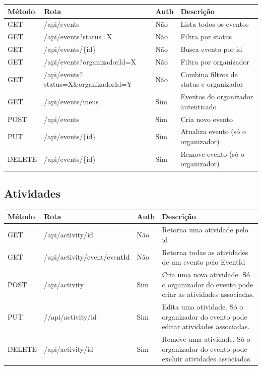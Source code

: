\documentclass[11pt, a4paper, oneside]{article}
\begin{document}
\begin{longtable}{L{1.5cm} L{6cm} L{1.5cm} L{5.5cm}}
\toprule
{}
\color{white}\textbf{Método} & \color{white}\textbf{Rota} & \color{white}\textbf{Auth} & \color{white}\textbf{Descrição} \\
\midrule
\endhead
GET & /api/events & Não & Lista todos os eventos \\
GET & /api/events?status=X & Não & Filtra por status \\
GET & /api/events/\{id\} & Não & Busca evento por id \\
GET & /api/events?organizadorId=X & Não & Filtra por organizador \\
GET & /api/events?status=X\&organizadorId=Y & Não & Combina filtros de status e organizador \\
GET & /api/events/meus & Sim & Eventos do organizador autenticado \\
POST & /api/events & Sim & Cria novo evento \\
PUT & /api/events/\{id\} & Sim & Atualiza evento (só o organizador) \\
DELETE & /api/events/\{id\} & Sim & Remove evento (só o organizador) \\
\bottomrule
\end{longtable}

\subsection{Atividades}

\begin{longtable}{L{1.5cm} L{6cm} L{1.5cm} L{5.5cm}}
\toprule
{}
\color{white}\textbf{Método} & \color{white}\textbf{Rota} & \color{white}\textbf{Auth} & \color{white}\textbf{Descrição} \\
\midrule
\endhead
GET & /api/activity/{id} & Não & Retorna uma atividade pelo id \\
GET & /api/activity/event/{eventId} & Não & Retorna todas as atividades de um evento pelo EventId \\
POST & /api/activity & Sim & Cria uma nova atividade. Só o organizador do evento pode criar as atividades associadas. \\
PUT & //api/activity/{id} & Sim & Edita uma atividade. Só o organizador do evento pode editar atividades associadas. \\
DELETE & /api/activity/{id} & Sim & Remove uma atividade. Só o organizador do evento pode excluir atividades associadas. \\
\end{longtable}
\end{document}
